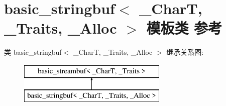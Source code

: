 \hypertarget{classbasic__stringbuf}{}\section{basic\+\_\+stringbuf$<$ \+\_\+\+CharT, \+\_\+\+Traits, \+\_\+\+Alloc $>$ 模板类 参考}
\label{classbasic__stringbuf}
类 basic\+\_\+stringbuf$<$ \+\_\+\+CharT, \+\_\+\+Traits, \+\_\+\+Alloc $>$ 继承关系图\+:\begin{figure}[H]
\begin{center}
\leavevmode
\includegraphics[height=2.000000cm]{classbasic__stringbuf}
\end{center}
\end{figure}

